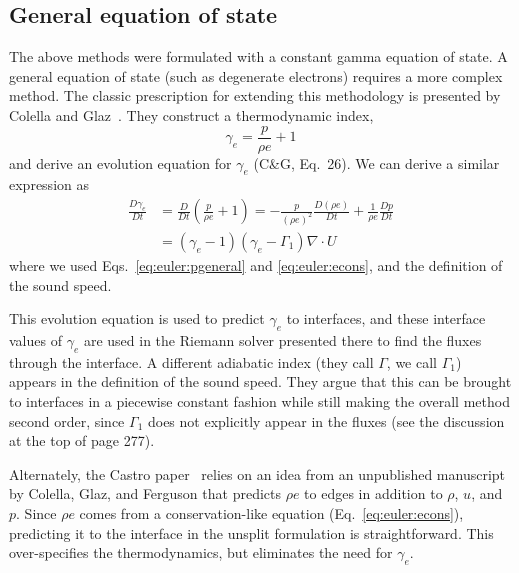 \subsection{General equation of state}

The above methods were formulated
with a constant gamma equation of state.  A general equation of state
(such as degenerate electrons) requires a more complex method.  The classic
prescription for extending this methodology is presented by Colella and
Glaz~\cite{colellaglaz:1985}.  They construct a thermodynamic index,
\begin{equation}
\gamma_e = \frac{p}{\rho e} + 1
\end{equation}
and derive an evolution equation for $\gamma_e$ (C\&G, Eq.\ 26).
We can derive a similar expression as
\begin{align}
\frac{D\gamma_e}{Dt} &= \frac{D}{Dt} \left ( \frac{p}{\rho e} + 1 \right )
   = - \frac{p}{(\rho e)^2} \frac{D(\rho e)}{Dt} + \frac{1}{\rho e} \frac{Dp}{Dt} \nonumber \\
   &= (\gamma_e - 1) (\gamma_e  - \Gamma_1) \nabla \cdot U \label{eq:gammae}
\end{align}
where we used Eqs.~\ref{eq:euler:pgeneral} and \ref{eq:euler:econs}, and the definition
of the sound speed.

This evolution equation is used to predict $\gamma_e$ to interfaces,
and these interface values of $\gamma_e$ are used in the Riemann
solver presented there to find the fluxes through the interface.  A
different adiabatic index (they call $\Gamma$, we call $\Gamma_1$)
appears in the definition of the sound speed.  They argue that this
can be brought to interfaces in a piecewise constant fashion while
still making the overall method second order, since $\Gamma_1$ does
not explicitly appear in the fluxes (see the discussion at the top of
page 277).

Alternately, the Castro paper~\cite{almgren:2010} relies on an idea
from an unpublished manuscript by Colella, Glaz, and Ferguson that
predicts $\rho e$ to edges in addition to $\rho$, $u$, and $p$.  Since
$\rho e$ comes from a conservation-like equation
(Eq.~\ref{eq:euler:econs}), predicting it to the interface in the
unsplit formulation is straightforward.  This over-specifies the
thermodynamics, but eliminates the need for $\gamma_e$.


